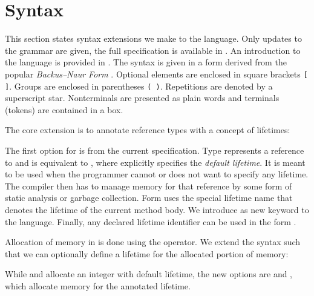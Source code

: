 \section{Syntax}\label{section:syntax}
This section states syntax extensions we make to the \whiley language.
Only updates to the grammar are given, the full specification is available in \cite{WLS}.
An introduction to the \whiley language is provided in .
The syntax is given in a form derived from the popular \emph{Backus–Naur Form} \cite{Knuth:1964:BNF:355588.365140}.
Optional elements are enclosed in square brackets \texttt{[ ]}.
Groups are enclosed in parentheses \texttt{( )}.
Repetitions are denoted by a superscript star.
Nonterminals are presented as plain words and terminals (tokens) are contained in a box.

The core extension is to annotate reference types with a concept of lifetimes:
\begin{syntax}

\end{syntax}
\noindent The first option for  is from the current \whiley specification.
Type  represents a reference to  and is equivalent to , where \whileyinline{*} explicitly specifies the \emph{default lifetime}.
It is meant to be used when the programmer cannot or does not want to specify any lifetime.
The compiler then has to manage memory for that reference by some form of static analysis or garbage collection.
Form  uses the special lifetime name  that denotes the lifetime of the current method body.
We introduce  as new keyword to the \whiley language.
Finally, any declared lifetime identifier  can be used in the form .

Allocation of memory in \whiley is done using the  operator.
We extend the syntax such that we can optionally define a lifetime for the allocated portion of memory:
\begin{syntax}
\end{syntax}
\noindent While  and  allocate an integer with default lifetime, the new options are  and , which allocate memory for the annotated lifetime.

